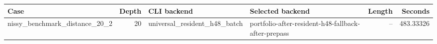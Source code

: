 {\small
\begin{tabular}{lrllrr}
\hline
Case & Depth & CLI backend & Selected backend & Length & Seconds \\
\hline
nissy\_benchmark\_distance\_20\_2 & 20 & universal\_resident\_h48\_batch & portfolio-after-resident-h48-fallback-after-prepass & -- & 483.33326 \\
\hline
\end{tabular}
}
